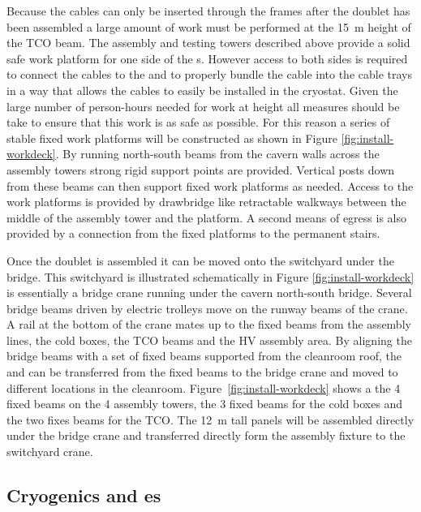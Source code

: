 Because the cables can only be inserted through the  frames after the  doublet has been assembled a large amount of work must be performed at the \SI{15}{m} height of the TCO beam. 
The  assembly and testing towers described above provide a solid safe work platform for one side of the s.
However access to both sides is required to connect the cables to the  and to properly bundle the cable into the cable trays in a way that allows the cables to easily be installed in the cryostat. 
Given the large number of person-hours needed for work at height all measures should be take to ensure that this work is as safe as possible. For this reason a series of stable fixed work platforms will be constructed as shown in Figure \ref{fig:install-workdeck}.
By running north-south beams from the cavern walls across the assembly towers strong rigid support points are provided. 
Vertical posts down from these beams can then support fixed work platforms as needed. Access to the work platforms is provided by drawbridge like retractable walkways between the middle of the assembly tower and the platform. 
A second means of egress is also provided by a connection from the fixed platforms to the permanent stairs. 



Once the  doublet is assembled it can be moved onto the switchyard under the bridge. 
This switchyard is illustrated schematically in Figure \ref{fig:install-workdeck} is essentially a bridge crane running under the cavern north-south bridge. 
Several bridge beams driven by electric trolleys  move on the runway beams of the crane.  
A rail at the bottom of the crane mates up to the fixed beams  from the assembly lines, the cold boxes, the TCO beams and the HV assembly area.
By aligning the bridge beams with a set of fixed beams supported from the cleanroom roof, the  and  can be transferred from the fixed beams to the bridge crane and moved to different locations in the cleanroom. 
Figure~\ref{fig:install-workdeck} shows a the 4 fixed beams on the 4 assembly towers, the 3 fixed beams for the cold boxes and the two fixes beams for the TCO. 
The \SI{12}{m} tall  panels will be assembled directly under the bridge crane and transferred directly form the assembly fixture to the switchyard crane.

\subsection{Cryogenics and \coldbox{}es}
\label{sec:fdsp-tc-infr-cryo}



